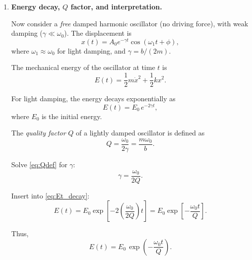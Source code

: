 \documentclass[12pt]{article}
\begin{document}
\begin{enumerate}
Plugging into \eqref{eq:Pdrive_avg}:
\begin{align}
\langle P_\text{drive} \rangle
&= \frac{1}{2} F_0 X \omega \sin\delta \\
&= \frac{1}{2} (b \omega X) X \omega \\
&= \frac{1}{2} b X^2 \omega^2.
\end{align}

So
\[
\boxed{
\langle P_\text{drive} \rangle
= \frac{1}{2} b X^2 \omega^2,
\qquad
\langle P_\text{damp} \rangle
= -\frac{1}{2} b X^2 \omega^2,
}
\]
and therefore
\[
\langle P_\text{drive} \rangle + \langle P_\text{damp} \rangle = 0.
\]

Interpretation: in steady state, over each cycle, the driver supplies exactly the energy that the damper removes. The oscillator's averaged mechanical energy is constant in time even though energy is continuously flowing in and being dissipated as heat.


\item \textbf{Energy decay, $Q$ factor, and interpretation.}

Now consider a \emph{free} damped harmonic oscillator (no driving force), with weak damping ($\gamma \ll \omega_0$). The displacement is
\[
x(t) = A_0 e^{-\gamma t} \cos(\omega_1 t + \phi),
\]
where $\omega_1 \approx \omega_0$ for light damping, and $\gamma = b/(2m)$.

The mechanical energy of the oscillator at time $t$ is
\[
E(t) = \frac{1}{2} m \dot{x}^2 + \frac{1}{2} k x^2.
\]

For light damping, the energy decays exponentially as
\begin{equation}
E(t) = E_0 \, e^{-2 \gamma t},
\label{eq:Et_decay}
\end{equation}
where $E_0$ is the initial energy.

The \emph{quality factor} $Q$ of a lightly damped oscillator is defined as
\begin{equation}
Q = \frac{\omega_0}{2\gamma}
= \frac{m \omega_0}{b}.
\label{eq:Qdef}
\end{equation}

Solve \eqref{eq:Qdef} for $\gamma$:
\[
\gamma = \frac{\omega_0}{2Q}.
\]

Insert into \eqref{eq:Et_decay}:
\[
E(t) = E_0 \exp\!\left[-2 \left(\frac{\omega_0}{2Q}\right) t \right]
= E_0 \exp\!\left[- \frac{\omega_0 t}{Q} \right].
\]

Thus,
\begin{equation}
\boxed{
E(t) = E_0 \, \exp\!\left( - \frac{\omega_0 t}{Q} \right).
}
\end{equation}


\end{enumerate}
\end{document}

